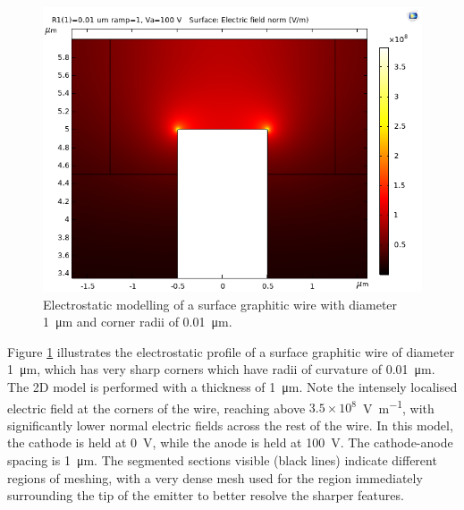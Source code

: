 \begin{refsection}
\begin{figure}[H]
    \centering
    \includegraphics[width=\textwidth]{Chapter7/Figs/Raster/example structure 0.01 normE.png}
    \caption{Electrostatic modelling of a surface graphitic wire with diameter 1~\si{\micro\metre} and corner radii of 0.01~\si{\micro\metre}.}
    \label{fig:comsol_es_wire0.01}
\end{figure}

Figure \ref{fig:comsol_es_wire0.01} illustrates the electrostatic profile of a surface graphitic wire of diameter 1~\si{\micro\metre}, which has very sharp corners which have radii of curvature of 0.01~\si{\micro\metre}. The 2D model is performed with a thickness of 1~\si{\micro\metre}. Note the intensely localised electric field at the corners of the wire, reaching above $3.5\times10^{8}$~\si{\volt\per\metre}, with significantly lower normal electric fields across the rest of the wire. In this model, the cathode is held at 0~\si{\volt}, while the anode is held at 100~\si{\volt}. The cathode-anode spacing is 1~\si{\micro\metre}. The segmented sections visible (black lines) indicate different regions of meshing, with a very dense mesh used for the region immediately surrounding the tip of the emitter to better resolve the sharper features.


\end{refsection}
